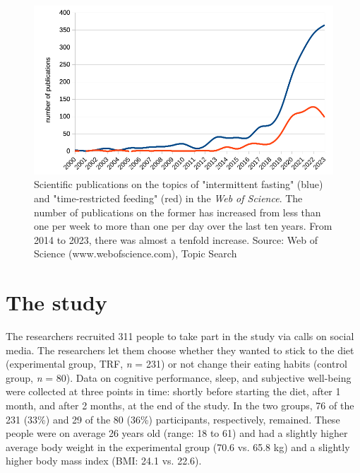 \documentclass[authordate, empirical]{jote-new-article}
\begin{document}
\begin{figure}[t!]

  \begin{fullwidth}
    \includegraphics[width=\linewidth]{media/image2.png}
    \caption{Scientific publications on the topics of "intermittent fasting" (blue) and "time-restricted feeding" (red) in the \emph{Web of Science}. The number of publications on the former has increased from less than one per week to more than one per day over the last ten years. From 2014 to 2023, there was almost a tenfold increase. Source: Web of Science (www.webofscience.com), Topic Search}
  \end{fullwidth}
\end{figure}




\section{The study}






The researchers recruited 311 people to take part in the study via calls on social media. The researchers let them choose whether they wanted to stick to the diet (experimental group, TRF, \emph{n }= 231) or not change their eating habits (control group, \emph{n }= 80). Data on cognitive performance, sleep, and subjective well-being were collected at three points in time: shortly before starting the diet, after 1 month, and after 2 months, at the end of the study. In the two groups, 76 of the 231 (33\%) and 29 of the 80 (36\%) participants, respectively, remained. These people were on average 26 years old (range: 18 to 61) and had a slightly higher average body weight in the experimental group (70.6 vs. 65.8 kg) and a slightly higher body mass index (BMI: 24.1 vs. 22.6).
\end{document}
